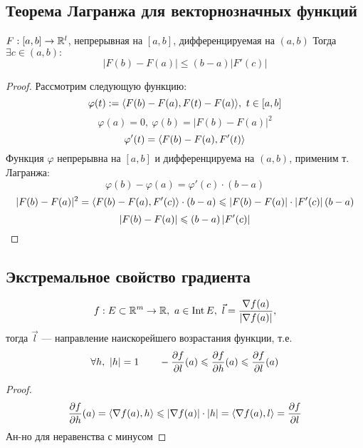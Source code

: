 \documentclass[../main.tex]{subfiles}
\begin{document}
\subsection{Теорема Лагранжа для векторнозначных функций}
\begin{theorem}
$F: [a, b] \rightarrow \mathbb{R}^l$, непрерывная на $[a, b]$, дифференцируемая на $(a, b)$
Тогда $\exists c \in (a, b):$
$$ | F(b) - F(a)| \leqslant (b - a) |F'(c)| $$
\end{theorem}
\begin{proof}
Рассмотрим следующую функцию: $$\varphi(t):=\scalar{ F(b) - F(a), F(t) - F(a)}, \ t \in [a, b]$$
    $$\varphi(a) = 0, \ \varphi(b) = |F(b) - F(a)|^2$$
    $$\varphi'(t) = \langle  F(b) - F(a), F'(t) \rangle$$
    Функция $\varphi$ непрерывна на $[a, b]$ и дифференцируема на $(a, b)$, применим т. Лагранжа:
    $$\varphi(b)-\varphi(a) = \varphi'(c) \cdot (b - a)$$
    $$| F(b) - F(a)|^2 = \langle  F(b) - F(a), F'(c) \rangle \cdot (b - a) \leqslant \left| F(b) - F(a) \right| \cdot \left| F'(c) \right|(b - a)$$
    $$\left| F(b) - F(a) \right| \leqslant (b - a) \left| F'(c) \right|$$
\end{proof}
\newpage

\subsection{Экстремальное свойство градиента}
\begin{theorem}
$$f : E \subset \mathbb{R}^m \rightarrow \mathbb{R}, \ a \in \operatorname*{Int} E, \ \vec{l} = \frac{\nabla f(a)}{|\nabla f(a)|},$$
тогда $\vec{l}$ --- направление наискорейшего возрастания функции, т.е. $$\forall h, \ \left| h \right| = 1 \qquad
-\frac{\partial f}{\partial l}(a) \leqslant \frac{\partial f}{\partial h}(a) \leqslant \frac{\partial f}{\partial l}(a)$$
\end{theorem}
\begin{proof}
    $$\frac{\partial f}{\partial h}(a) = \langle  \nabla f(a), h \rangle \leqslant \left| \nabla f(a) \right| \cdot \left| h \right| = \langle  \nabla f(a), l  \rangle = \frac{\partial f}{\partial l}$$
    Ан-но для неравенства с минусом
\end{proof}
\newpage
\end{document}
